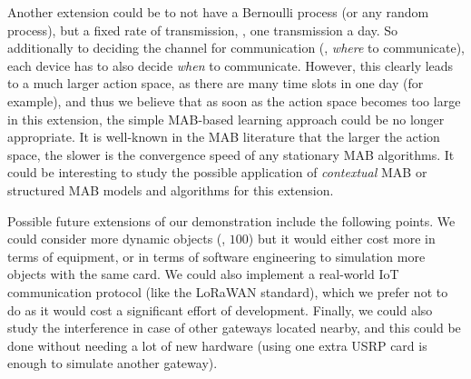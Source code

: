 Another extension could be to not have a Bernoulli process (or any random process), but a fixed rate of transmission, \eg, one transmission a day.
So additionally to deciding the channel for communication (\ie, \emph{where} to communicate), each device has to also decide \emph{when} to communicate.
However, this clearly leads to a much larger action space, as there are many time slots in one day (for example), and thus we believe that as soon as the action space becomes too large in this extension, the simple MAB-based learning approach could be no longer appropriate.
It is well-known in the MAB literature that the larger the action space, the slower is the convergence speed of any stationary MAB algorithms.
It could be interesting to study the possible application of \emph{contextual} MAB \cite{Li10,Luo17} or structured MAB \cite{Combes17} models and algorithms for this extension.



Possible future extensions of our demonstration include the following points.
We could consider more dynamic objects (\eg, $100$) but it would either cost more in terms of equipment, or in terms of software engineering to simulation more objects with the same card.
We could also implement a real-world IoT communication protocol (like the LoRaWAN standard), which we prefer not to do as it would cost a significant effort of development.
Finally, we could also study the interference in case of other gateways located nearby, and this could be done without needing a lot of new hardware (using one extra USRP card is enough to simulate another gateway).
%



